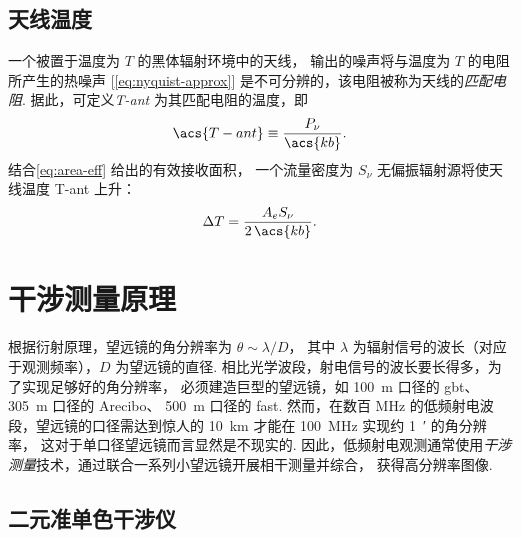 \subsection{天线温度}
\label{sec:t-ant}

一个被置于温度为 $T$ 的黑体辐射环境中的天线，
输出的噪声将与温度为 $T$ 的电阻所产生的热噪声 [\autoref{eq:nyquist-approx}]
是不可分辨的，该电阻被称为天线的\emph{匹配电阻}.
据此，可定义\emph{\ac{T-ant}} 为其匹配电阻的温度，即
\begin{equation}
  \label{eq:t-ant}
  \acs{T-ant} \equiv \frac{P_{\nu}}{\acs{kb}} .
\end{equation}
结合\autoref{eq:area-eff} 给出的有效接收面积，
一个流量密度为 $S_{\nu}$ 无偏振辐射源将使天线温度 \acs{T-ant} 上升：
\begin{equation}
  \label{eq:dt-source}
  \Delta T = \frac{A_e S_{\nu}}{2\,\acs{kb}} .
\end{equation}


\section{干涉测量原理}
\label{sec:interferometry}

根据衍射原理，望远镜的角分辨率为 $\theta \sim \lambda / D$，
其中 $\lambda$ 为辐射信号的波长（对应于观测频率），$D$ 为望远镜的直径.
相比光学波段，射电信号的波长要长得多，为了实现足够好的角分辨率，
必须建造巨型的望远镜，如 \SI{100}{\meter} 口径的 \ac{gbt}、
\SI{305}{\meter} 口径的 Arecibo、
\SI{500}{\meter} 口径的 \ac{fast}.
然而，在数百 \si{\MHz} 的低频射电波段，望远镜的口径需达到惊人的 \SI{10}{\km}
才能在 \SI{100}{\MHz} 实现约 \SI{1}{\arcminute} 的角分辨率，
这对于单口径望远镜而言显然是不现实的.
因此，低频射电观测通常使用\emph{干涉测量}技术，通过联合一系列小望远镜开展相干测量并综合，
获得高分辨率图像.

\subsection{二元准单色干涉仪}

